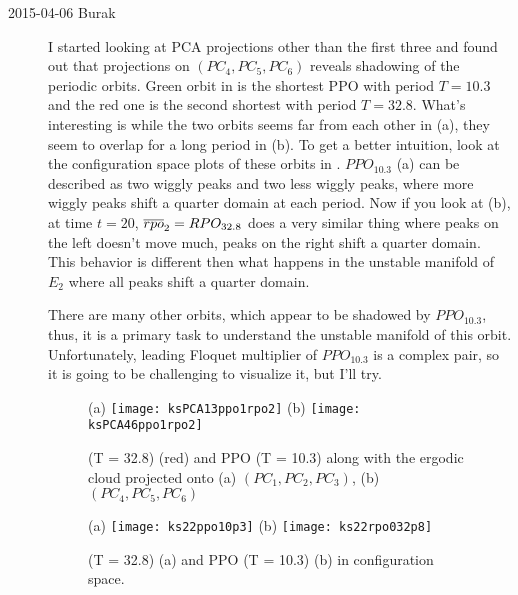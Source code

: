 \begin{description}
\item[2015-04-06 Burak] I started looking at PCA projections other than
the first three and found out that projections on $(PC_4, PC_5, PC_6)$
reveals shadowing of the periodic orbits.
Green orbit in  is the shortest PPO with
period $T=10.3$ and the red one is the second shortest  with period
$T=32.8$. What's interesting is while the two orbits seems far from
each other in  (a), they seem to overlap
for a long period in  (b). To get a better
intuition, look at the configuration space plots of these orbits in
. $PPO_{10.3}$ (a) can be described as two
wiggly peaks and two less wiggly peaks, where more wiggly peaks
shift a quarter domain at each period. Now if you look at
 (b), at time $t = 20$, $\overline{rpo}_{2}=RPO_{32.8}$ does
a very similar thing where peaks on the left doesn't move much, peaks
on the right shift a quarter domain. This behavior is different then
what happens in the unstable manifold of $E_2$ where all peaks shift a
quarter domain.

There are many other orbits, which appear to be shadowed by
$PPO_{10.3}$, thus, it is a primary task to understand the unstable
manifold of this orbit.
Unfortunately, leading Floquet multiplier of $PPO_{10.3}$ is a complex
pair, so it is going to be challenging to visualize it, but I'll try.

\begin{figure}[ht]
\begin{center}
    (a) \texttt{[image: ksPCA13ppo1rpo2]}
    (b) \texttt{[image: ksPCA46ppo1rpo2]}
\end{center}
    \caption[]{
         (T = 32.8) (red) and PPO (T = 10.3) along with the ergodic
        cloud projected onto (a) $(PC_1, PC_2, PC_3)$,
        (b) $(PC_4, PC_5, PC_6)$
    }
    \label{f-ppo10p3rpo32p8conf}
\end{figure}

\begin{figure}[ht]
\begin{center}
    (a) \texttt{[image: ks22ppo10p3]}
    (b) \texttt{[image: ks22rpo032p8]}
\end{center}
    \caption[]{
         (T = 32.8) (a) and PPO (T = 10.3) (b) in configuration
        space.
    }
    \label{f-ppo10p3rpo32p8PCA}
\end{figure}


\end{description}
